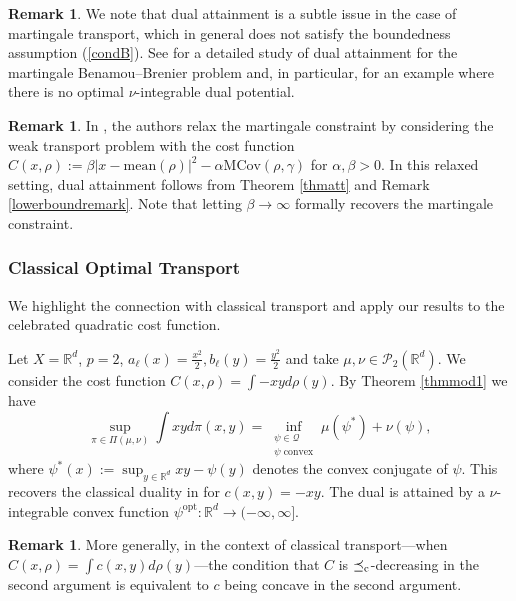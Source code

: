 \documentclass[reqno, a4paper]{amsart}
\newcommand{\lc}{\preceq_{\textnormal{c}}}
\newcommand{\cP}{\mathcal{P}}
\renewcommand{\P}{\cP}
\newcommand{\R}{\mathbb R}
\theoremstyle{definition}
\theoremstyle{definition}
\theoremstyle{definition}
\newtheorem{remark}[theorem]{Remark}
\newcommand{\mean}{\mathrm{mean}}
\begin{document}
\begin{remark} \label{nonintdual}
    We note that dual attainment is a subtle issue in the case of martingale transport, which in general does not satisfy the boundedness assumption (\ref{condB}). See \cite{backhoffveraguas2025existencebassmartingalesmartingale} for a detailed study of dual attainment for the martingale Benamou--Brenier problem and, in particular, \cite[Example 6.7]{backhoffveraguas2025existencebassmartingalesmartingale} for an example where there is no optimal $\nu$-integrable dual potential.
    \end{remark}
    \begin{remark} In \cite[Theorem 5.4]{BePaRiSc25}, the authors relax the martingale constraint by considering the weak transport problem with the cost function $C(x,\rho):=\beta|x-\mean (\rho)|^2-\alpha\text{MCov}(\rho,\gamma)$ for $\alpha,\beta>0.$ In this relaxed setting, dual attainment follows from Theorem \ref{thmatt} and Remark \ref{lowerboundremark}. Note that letting $\beta\to\infty$ formally recovers the martingale constraint.
\end{remark}


\subsubsection{Classical Optimal Transport} We highlight the connection with classical transport and apply our results to the celebrated quadratic cost function. 

Let $X=\R^d$,  $p=2$, $a_\ell(x)=\frac{x^2}{2} , b_\ell(y)=\frac{y^2}{2}$ and take $\mu,\nu\in\P_2(\R^d)$. We consider the cost function $C(x,\rho)=\int-xyd\rho(y)$. By Theorem \ref{thmmod1} we have
$$\sup_{\pi\in\Pi(\mu,\nu)}\int xy d\pi(x,y)=\inf_{\substack{\psi\in\mathcal Q\\\psi \text{ convex}}}\mu(\psi^*)+\nu(\psi),$$
where $\psi^*(x):=\sup_{y\in\R^d}xy-\psi(y)$ denotes the convex conjugate of $\psi$. This recovers the classical duality in \cite[Theorem 5.10]{villani2008optimal} for $c(x,y)=-xy.$ The dual is attained by a $\nu$-integrable convex function $\psi^{\text{opt}}:\R^d\to(-\infty,\infty]$. 

\begin{remark}
    More generally, in the context of classical transport---when $C(x,\rho)=\int c(x,y)d\rho(y)$---the condition that $C$ is $\lc$-decreasing in the second argument is equivalent to $c$ being concave in the second argument.
\end{remark}
\end{document}
